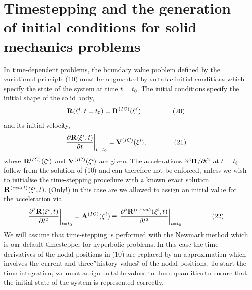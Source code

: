 \hypertarget{index_Solid_IC}{}\section{Timestepping and the generation of initial conditions for solid mechanics problems}\label{index_Solid_IC}
In time-\/dependent problems, the boundary value problem defined by the variational principle (10) must be augmented by suitable initial conditions which specify the state of the system at time $ t=t_0. $ The initial conditions specify the initial shape of the solid body, \[ {\bf R}(\xi^i,t=t_0) = {\bf R}^{(IC)}(\xi^i), \ \ \ \ \ \ \ \ \ \ \ \ \ (20) \] and its initial velocity, \[ \left. \frac{\partial {\bf R}(\xi^i,t)}{\partial t} \right|_{t=t_0} = {\bf V}^{(IC)}(\xi^i), \ \ \ \ \ \ \ \ \ \ \ \ (21) \] where $ {\bf R}^{(IC)}(\xi^i) $ and $ {\bf V}^{(IC)}(\xi^i) $ are given. The accelerations $ \partial^2 {\bf R}/\partial t^2 $ at $t=t_0$ follow from the solution of (10) and can therefore not be enforced, unless we wish to initialise the time-\/stepping procedure with a known exact solution $ {\bf R}^{(exact)}(\xi^i,t) $. (Only!) in this case are we allowed to assign an initial value for the acceleration via \[ \left. \frac{\partial^2 {\bf R}(\xi^i,t)}{\partial t^2} \right|_{t=t_0} = {\bf A}^{(IC)}(\xi^i) \equiv \left. \frac{\partial^2 {\bf R}^{(exact)}(\xi^i,t)}{\partial t^2} \right|_{t=t_0}. \ \ \ \ \ \ \ \ \ \ \ \ (22) \] We will assume that time-\/stepping is performed with the {\ttfamily Newmark} method which is our default timestepper for hyperbolic problems. In this case the time-\/derivatives of the nodal positions in (10) are replaced by an approximation which involves the current and three \char`\"{}history values\char`\"{} of the nodal positions. To start the time-\/integration, we must assign suitable values to these quantities to ensure that the initial state of the system is represented correctly.

